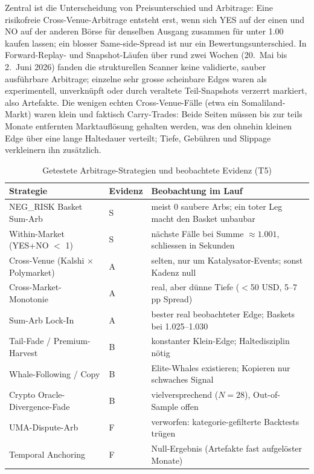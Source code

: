 Zentral ist die Unterscheidung von Preisunterschied und Arbitrage: Eine risikofreie
Cross-Venue-Arbitrage entsteht erst, wenn sich YES auf der einen und NO auf der
anderen Börse für denselben Ausgang zusammen für unter 1.00 kaufen lassen; ein
blosser Same-side-Spread ist nur ein Bewertungsunterschied. In Forward-Replay- und
Snapshot-Läufen über rund zwei Wochen (20.~Mai bis 2.~Juni 2026) fanden die
strukturellen Scanner keine validierte, sauber ausführbare Arbitrage; einzelne sehr
grosse scheinbare Edges waren als experimentell, unverknüpft oder durch veraltete
Teil-Snapshots verzerrt markiert, also Artefakte. Die wenigen echten
Cross-Venue-Fälle (etwa ein Somaliland-Markt) waren klein und faktisch
Carry-Trades: Beide Seiten müssen bis zur teils Monate entfernten Marktauflösung
gehalten werden, was den ohnehin kleinen Edge über eine lange Haltedauer verteilt;
Tiefe, Gebühren und Slippage verkleinern ihn zusätzlich.

\begin{table}[ht]
\centering
\caption{Getestete Arbitrage-Strategien und beobachtete Evidenz (T5)}
\label{tab:t5}
\small
\begin{tabular}{@{}llp{6.6cm}@{}}
\toprule
Strategie & Evidenz & Beobachtung im Lauf \\
\midrule
NEG\_RISK Basket Sum-Arb & S & meist 0 saubere Arbs; ein toter Leg macht den Basket unbaubar \\
Within-Market (YES+NO $<$ 1) & S & nächste Fälle bei Summe $\approx 1.001$, schliessen in Sekunden \\
Cross-Venue (Kalshi $\times$ Polymarket) & A & selten, nur um Katalysator-Events; sonst Kadenz null \\
Cross-Market-Monotonie & A & real, aber dünne Tiefe ($<$50 USD, 5--7 pp Spread) \\
Sum-Arb Lock-In & A & bester real beobachteter Edge; Baskets bei 1.025--1.030 \\
Tail-Fade / Premium-Harvest & B & konstanter Klein-Edge; Haltedisziplin nötig \\
Whale-Following / Copy & B & Elite-Whales existieren; Kopieren nur schwaches Signal \\
Crypto Oracle-Divergence-Fade & B & vielversprechend ($N=28$), Out-of-Sample offen \\
UMA-Dispute-Arb & F & verworfen: kategorie-gefilterte Backtests trügen \\
Temporal Anchoring & F & Null-Ergebnis (Artefakte fast aufgelöster Monate) \\
\bottomrule
\end{tabular}
\end{table}

